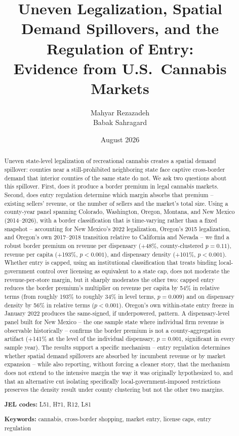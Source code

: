 \documentclass[12pt]{article}
\title{Uneven Legalization, Spatial Demand Spillovers, and the Regulation of Entry:\\
Evidence from U.S.\ Cannabis Markets}
\author{Mahyar Rezazadeh \\ Babak Sahragard}
\date{August 2026}
\begin{document}
\maketitle

\begin{singlespace}
\begin{abstract}
\noindent Uneven state-level legalization of recreational cannabis creates a spatial demand spillover: counties
near a still-prohibited neighboring state face captive cross-border demand that interior counties of the same
state do not. We ask two questions about this spillover. First, does it produce a border premium in legal
cannabis markets. Second, does entry regulation determine which margin absorbs that premium -- existing
sellers' revenue, or the number of sellers and the market's total size. Using a county-year panel spanning
Colorado, Washington, Oregon, Montana, and New Mexico (2014--2026), with a border classification that is
time-varying rather than a fixed snapshot -- accounting for New Mexico's 2022 legalization, Oregon's 2015
legalization, and Oregon's own 2017--2018 transition relative to California and Nevada -- we find a robust
border premium on revenue per dispensary (+48\%, county-clustered $p=0.11$), revenue per capita (+193\%,
$p<0.001$), and dispensary density (+101\%, $p<0.001$). Whether entry is capped, using an institutional
classification that treats binding local-government control over licensing as equivalent to a state cap, does
not moderate the revenue-per-store margin, but it sharply moderates the other two: capped entry reduces the
border premium's multiplier on revenue per capita by 54\% in relative terms (from roughly 193\% to roughly
34\% in level terms, $p=0.009$) and on dispensary density by 56\% in relative terms ($p<0.001$). Oregon's own
within-state entry freeze in January 2022 produces the same-signed, if
underpowered, pattern. A dispensary-level panel built for New Mexico -- the one sample state where individual
firm revenue is observable historically -- confirms the border premium is not a county-aggregation artifact
(+141\% at the level of the individual dispensary, $p=0.001$, significant in every sample year). The results
support a specific mechanism -- entry regulation determines whether spatial
demand spillovers are absorbed by incumbent revenue or by market expansion -- while also reporting, without
forcing a cleaner story, that the mechanism does not extend to the intensive margin the way it was originally
hypothesized to, and that an alternative cut isolating specifically local-government-imposed restrictions
preserves the density result under county clustering but not the other two margins.

\vspace{0.5em}
\noindent\textbf{JEL codes:} L51, H71, R12, L81
\vspace{0.3em}

\noindent\textbf{Keywords:} cannabis, cross-border shopping, market entry, license caps, entry regulation
\end{abstract}
\end{singlespace}
\end{document}
